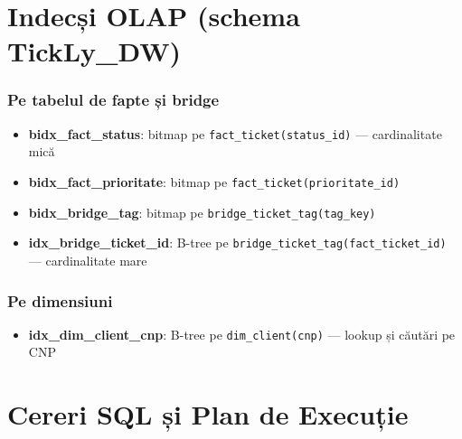 \section{Indecși OLAP (schema TickLy\_DW)}

\subsubsection{Pe tabelul de fapte și bridge}

\begin{itemize}
    \item \textbf{bidx\_fact\_status}: bitmap pe \texttt{fact\_ticket(status\_id)} — cardinalitate mică
    \item \textbf{bidx\_fact\_prioritate}: bitmap pe \texttt{fact\_ticket(prioritate\_id)}
    \item \textbf{bidx\_bridge\_tag}: bitmap pe \texttt{bridge\_ticket\_tag(tag\_key)}
    \item \textbf{idx\_bridge\_ticket\_id}: B-tree pe \texttt{bridge\_ticket\_tag(fact\_ticket\_id)} — cardinalitate mare
\end{itemize}

\subsubsection{Pe dimensiuni}

\begin{itemize}
    \item \textbf{idx\_dim\_client\_cnp}: B-tree pe \texttt{dim\_client(cnp)} — lookup și căutări pe CNP
\end{itemize}

\section{Cereri SQL și Plan de Execuție}

